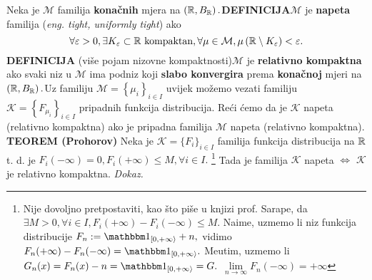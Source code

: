 \documentclass{article}
\begin{document}
Neka je \(\mathcal M\) familija \textbf{konačnih} mjera na \(\left(\Bbb R,B_{\Bbb R}\right).\)\newline\textbf{DEFINICIJA}\newline \(\mathcal M\) je \textbf{napeta} familija (\emph{eng. tight, uniformly tight}) ako \[\forall\varepsilon>0,\exists K_\varepsilon\subset\Bbb R \text{ kompaktan},\forall\mu\in\mathcal M,\mu\left(\Bbb R\setminus K_\varepsilon\right)<\varepsilon.\]\textbf{DEFINICIJA} (više pojam nizovne kompaktnosti)\newline \(\mathcal M\) je \textbf{relativno kompaktna} ako svaki niz u \(\mathcal M\) ima podniz koji \textbf{slabo konvergira} prema \textbf{konačnoj} mjeri na \(\left(\Bbb R, B_{\Bbb R}\right).\)\newline\newline Uz familiju \(\mathcal M=\left\{\mu_i\right\}_{i\in I}\) uvijek možemo vezati familiju \(\mathcal K=\left\{F_{\mu_i}\right\}_{i\in I}\) pripadnih funkcija distribucija. Reći ćemo da je \(\mathcal K\) napeta (relativno kompaktna) ako je pripadna familija \(\mathcal M\) napeta (relativno kompaktna).\newline\newline
\textbf{TEOREM (Prohorov)}\newline
Neka je \(\mathcal K=\{F_i\}_{i\in I}\) familija funkcija distribucija na \(\Bbb R\) t. d. je \(F_i(-\infty)=0,F_i(+\infty)\le M,\forall i\in I.\) \footnote[31]{Nije dovoljno pretpostaviti, kao što piše u knjizi prof. Sarape, da \(\exists M>0,\forall i\in I,F_i(+\infty)-F_i(-\infty)\le M.\) Naime, uzmemo li niz funkcija distribucije \(F_n:=\mathbbm 1_{[0,+\infty\rangle}+n,\) vidimo \(F_n(+\infty)-F_n(-\infty)=\mathbbm 1_{[0,+\infty\rangle}. \) Me\dj{}utim, uzmemo li \(G_n(x)=F_n(x)-n=\mathbbm 1_{[0,+\infty\rangle}=G.\) \(\lim\limits_{n\to\infty}F_n(-\infty)=+\infty\)}  Tada  je familija \(\mathcal K\) napeta \(\Leftrightarrow\) \(\mathcal K\) je relativno kompaktna.\newline\newline
\textit{Dokaz.}
\end{document}
